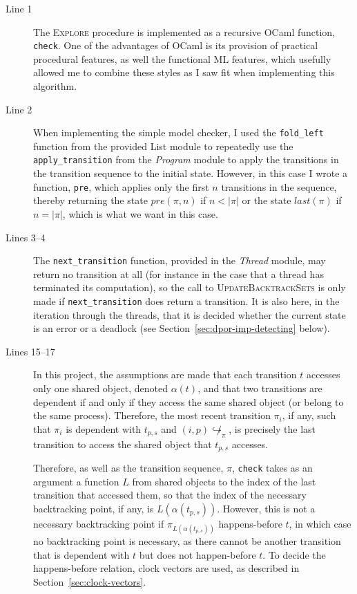 \documentclass[12pt,a4paper,twoside,openright]{report}
\begin{document}
\begin{description}
	\item[Line 1] The \textsc{Explore} procedure
	is implemented as a recursive OCaml function,
	\texttt{check}.
	One of the advantages of OCaml is its provision
	of practical procedural features, as well the
	functional ML features, which usefully allowed
	me to combine these styles as I saw fit when
	implementing this algorithm.

	\item[Line 2] When implementing the simple
	model checker, I used the \texttt{fold\_left}
	function from the provided List module to
	repeatedly use the \texttt{apply\_transition}
	from the \textit{Program} module to apply
	the transitions in the transition sequence
	to the initial state. However, in this case
	I wrote a function, \texttt{pre},
	which applies only the first
	$n$ transitions in the sequence,
	thereby returning the state
	$\textit{pre}(\pi, n)$ if $n < |\pi|$
	or the state $\textit{last}(\pi)$ if
	$n = |\pi|$, which is what we want in
	this case.

	\item[Lines 3--4] The \texttt{next\_transition}
	function, provided in the \textit{Thread} module,
	may return no transition at all (for instance
	in the case that a thread has terminated its
	computation), so the call to 
	\textsc{UpdateBacktrackSets} is only made if
	\texttt{next\_transition} does return a
	transition. It is also here, in the
	iteration through the threads,
	that it is decided whether the current
	state is an error or a deadlock
	(see Section~\ref{sec:dpor-imp-detecting}
	below).

	\item[Lines 15--17] In this project,
	the assumptions are made that
	each transition $t$ accesses only one shared
	object, denoted $\alpha(t)$,
	and that two transitions are
	dependent if and only if they access
	the same shared object (or belong to the
	same process). Therefore, the most
	recent transition $\pi_i$, if any, such that
	$\pi_i$ is dependent with $t_{p,s}$
	and $(i,p)\!\not\hookrightarrow_\pi$,
	is precisely the last transition
	to access the shared object that
	$t_{p,s}$ accesses.

	Therefore, as well as the transition
	sequence, $\pi$, \texttt{check} takes
	as an argument 
	a function $L$ from shared objects to
	the index of the last transition that
	accessed them, so that the index of the
	necessary backtracking point, if any, is
	$L(\alpha(t_{p,s}))$. However, this
	is not a necessary backtracking point if
	$\pi_{L(\alpha(t_{p,s}))}$ happens-before
	$t$, in which case no backtracking point
	is necessary, as there cannot be another
	transition that is dependent with $t$
	but does not happen-before $t$. To
	decide the happens-before relation,
	clock vectors are used, as described 
	in Section~\ref{sec:clock-vectors}.


\end{description}
\end{document}
